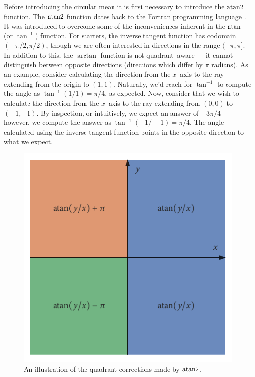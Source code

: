 Before introducing the circular mean it is first necessary to introduce the $\operatorname{atan2}$ function. The 
$\operatorname{atan2}$ function dates back to the Fortran programming language \parencite{organick66}. It was 
introduced to overcome some of the inconveniences inherent in the $\atan$ (or $\tan^{-1}$) function. 
For starters, the inverse tangent function has codomain $(-\pi/2, \pi/2)$, though we are often 
interested in directions in the range $(-\pi, \pi]$. In addition to this, the $\arctan$ function is 
not quadrant--aware --- it cannot distinguish between opposite directions (directions which differ by 
$\pi$ radians). As an example, consider calculating the direction from the $x$--axis to the ray 
extending from the origin to $(1, 1)$. Naturally, we'd reach for $\tan^{-1}$ to compute the angle as 
$\tan^{-1}(1/1) = \pi/4$, as expected. Now, consider that we wish to calculate the direction from the 
$x$--axis to the ray extending from $(0, 0)$ to $(-1, -1)$. By inspection, or intuitively, we expect 
an answer of $-3\pi/4$ --- however, we compute the answer as $\tan^{-1}(-1/-1) = \pi/4$. The angle 
calculated using the inverse tangent function points in the opposite direction to what we expect.

\begin{figure}
	\includegraphics{atan_quadrants.pdf}
	\caption{An illustration of the quadrant corrections made by $\operatorname{atan2}$.}
	\label{fig:atan_quadrants}
\end{figure}

